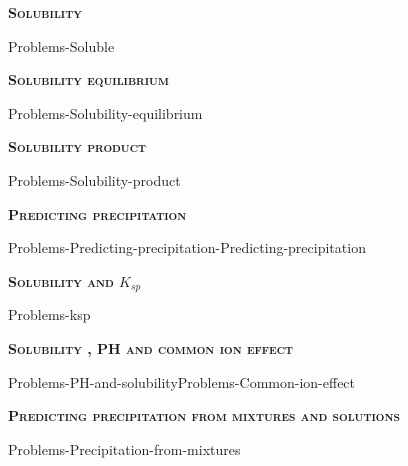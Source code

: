 \documentclass[main.tex]{subfiles}
\newcommand\chapterlabel{Ch-solubility}
\begin{document}
\newpage
\setdoublesep{0.35700 em}  %
\setatomsep{1.78500 em}    %
\setbondoffset{0.18265 em} %
\renewcommand{\bondwidth}{0.06642 em} %
\setbondstyle{line width = \bondwidth}
\fancyhfoffset[E,O]{0pt}
\setlength{\columnsep}{30pt}
\begin{conclusion}
\iftoggle{chem121}{}{\setcounter{chapter}{6}}
\end{conclusion}
\begin{multicols*}{2}\setcounter{numA}{1}  %

{\raggedright\textsc{\textbf{Solubility }}\par} {Problems-Soluble}
 
{\raggedright\textsc{\textbf{Solubility equilibrium}}\par}{Problems-Solubility-equilibrium}

{\raggedright\textsc{\textbf{Solubility product}}\par} {Problems-Solubility-product}
{\raggedright\textsc{\textbf{Predicting precipitation}}\par} {Problems-Predicting-precipitation-Predicting-precipitation}
 {\raggedright\textsc{\textbf{Solubility and $K_{sp}$}}\par} {Problems-ksp}
 {\raggedright\textsc{\textbf{Solubility , PH and common ion effect}}\par} {Problems-PH-and-solubility}{Problems-Common-ion-effect}

   {\raggedright\textsc{\textbf{Predicting precipitation from mixtures and solutions}}\par} {Problems-Precipitation-from-mixtures}


\end{multicols*} \iftoggle{showfinalanswers}{
\newpage\fancyhfoffset[E,O]{0pt}
\begin{answerbox}
\begin{answersenvironment}
 \begin{localsize}{10}
{ \checkoddpage\ifoddpage    \else   \clearpage\thispagestyle{empty}\mbox{}\clearpage\fi
\Large \bf Answers}
\SetupExSheets{ headings = inline-nr , counter-format = qu) ,}
\printsolutions 
  \vspace{20cm}
 \end{localsize}
 \end{answersenvironment}
\end{answerbox}
}{}
\checkoddpage\ifoddpage   \clearpage\thispagestyle{empty}\mbox{}\clearpage \else   \fi
\end{document}

